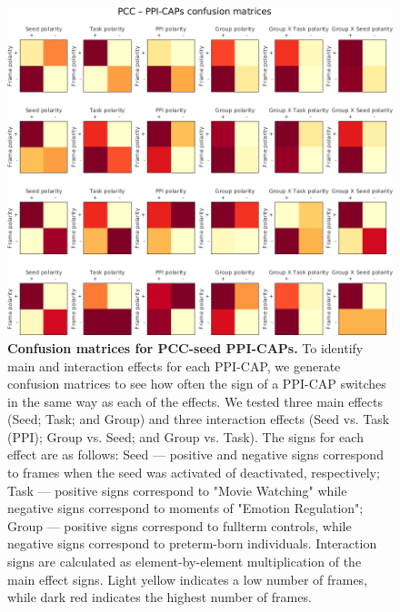 \begin{figure}[h]
\centering
\includegraphics[width=1\textwidth]{images/Appendix/PCCK4_PPICAPs_confusionMatrices.png}
\vspace{5mm}
\caption{\textbf{Confusion matrices for PCC-seed PPI-CAPs.} To identify main and interaction effects for each PPI-CAP, we generate confusion matrices to see how often the sign of a PPI-CAP switches in the same way as each of the effects. We tested three main effects (Seed; Task; and Group) and three interaction effects (Seed vs. Task (PPI); Group vs. Seed; and Group vs. Task). The signs for each effect are as follows: Seed --- positive and negative signs correspond to frames when the seed was activated of deactivated, respectively;  Task --- positive signs correspond to "Movie Watching" while negative signs correspond to moments of "Emotion Regulation"; Group --- positive signs correspond to fullterm controls, while negative signs correspond to preterm-born individuals. Interaction signs are calculated as element-by-element multiplication of the main effect signs. Light yellow indicates a low number of frames, while dark red indicates the highest number of frames. }
\label{fig:app_pcc_confusion}
\end{figure}





